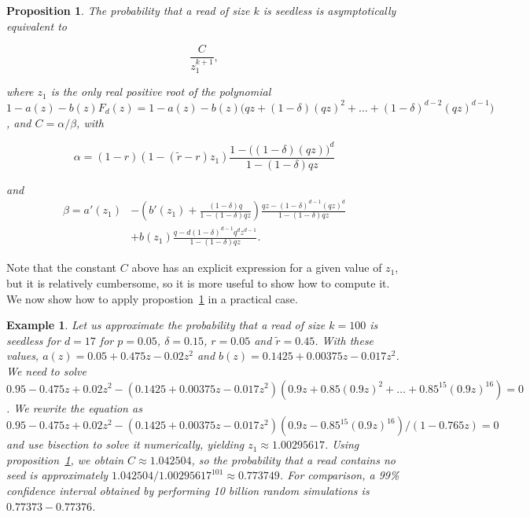 \documentclass{article}
\newtheorem{example}{Example}
\newtheorem{proposition}{Proposition}
\begin{document}
\begin{proposition}
\label{th:pins}
The probability that a read of size $k$ is seedless is asymptotically
equivalent to

\begin{equation*}
\frac{C}{z_1^{k+1}},
\end{equation*}

\noindent
where $z_1$ is the only real positive root of the polynomial
$1-a(z)-b(z)F_d(z) = 1-a(z)-b(z)\big(qz+(1-\delta)(qz)^2 + \ldots +
(1-\delta)^{d-2}(qz)^{d-1}\big)$, and $C = \alpha / \beta$, with

\begin{equation*}
\alpha = (1-r)(1-(\tilde{r}-r)z_1)
   \frac{1-\big((1-\delta)(qz)\big)^d}{1-(1-\delta)qz}
\end{equation*}

\noindent
and
\begin{equation*}
\begin{split}
\beta = a'(z_1) &- \left( b'(z_1) +
\frac{(1-\delta)q}{1-(1-\delta)qz}\right)
\frac{qz-(1-\delta)^{d-1}(qz)^d}{1-(1-\delta)qz} \\
&+b(z_1) \frac{q-d(1-\delta)^{d-1}q^dz^{d-1}}{1-(1-\delta)qz}.
\end{split}
\end{equation*}
\end{proposition}

Note that the constant $C$ above has an explicit expression for a given
value of $z_1$, but it is relatively cumbersome, so it is more useful to
show how to compute it. We now show how to apply propostion~\ref{th:pins}
in a practical case.

\begin{example}
\label{ex:num3}
Let us approximate the probability that a read of size $k=100$ is seedless
for $d=17$ for $p=0.05$, $\delta=0.15$, $r=0.05$ and $\tilde{r}=0.45$.
With these values, $a(z) = 0.05 +0.475z -0.02z^2$ and $b(z) = 0.1425 +
0.00375z-0.017z^2$. We need to solve $0.95-0.475z+0.02z^2 - (0.1425
+0.00375z-0.017z^2)(0.9z+0.85(0.9z)^2+\ldots+0.85^{15}(0.9z)^{16}) = 0$.
We rewrite the equation as $0.95-0.475z+0.02z^2 - (0.1425
+0.00375z-0.017z^2)(0.9z-0.85^{15}(0.9z)^{16})/(1-0.765z) = 0$ and use
bisection to solve it numerically, yielding $z_1 \approx 1.00295617$.
Using proposition~\ref{th:pins}, we obtain $C \approx 1.042504$, so the
probability that a read contains no seed is approximately $1.042504 /
1.00295617^{101} \approx 0.773749$. For comparison, a 99\% confidence
interval obtained by performing 10 billion random simulations is
$0.77373-0.77376$.
\end{example}
\end{document}

